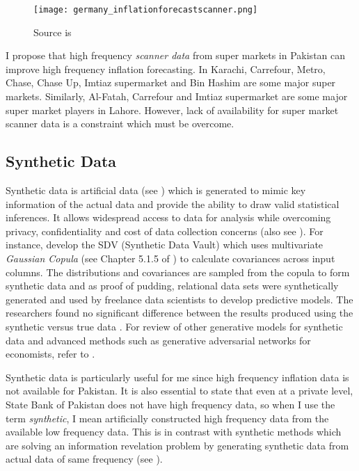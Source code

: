 \documentclass[12pt]{article}
\newcommand{\1}{\mathbbm 1}
\begin{document}
		
		
		\begin{figure}[H]
			\begin{Center}
				\texttt{[image: germany\_inflationforecastscanner.png]}
				\caption{Source is \cite{beck2022}}
			\end{Center}
		\end{figure}
		
		
		I propose that high frequency \textit{scanner data} from super markets in Pakistan can improve high frequency inflation forecasting. In Karachi, Carrefour, Metro, Chase, Chase Up, Imtiaz supermarket and Bin Hashim are some major super markets. Similarly, Al-Fatah, Carrefour and Imtiaz supermarket are some major super market players in Lahore. However, lack of availability for super market scanner data is a constraint which must be overcome. 
		
		\subsection{Synthetic Data}
		
		
		Synthetic data is artificial data (see \cite{nikolenko2021synthetic}) which is generated to mimic key information of the actual data and provide the ability to draw valid statistical inferences. It allows widespread access to data for analysis while overcoming privacy, confidentiality and cost of data collection concerns (also see \cite{raghunathan2021synthetic}). For instance, \cite{patki2016synthetic} develop the SDV (Synthetic Data Vault) which uses multivariate \textit{Gaussian Copula} (see Chapter 5.1.5 of \cite{stachurski2016primer}) to calculate covariances across input columns. The distributions and covariances are sampled from the copula to form synthetic data and as proof of pudding, relational data sets were synthetically generated and used by freelance data scientists to develop predictive models. The researchers found no significant difference between the results produced using the synthetic versus true data \cite{patki2016synthetic}. For review of other generative models for synthetic data and advanced methods such as generative adversarial networks for economists, refer to \cite{koenecke2020synthetic}.
		
		Synthetic data is particularly useful for me since high frequency inflation data is not available for Pakistan. It is also essential to state that even at a private level, State Bank of Pakistan does not have high frequency data, so when I use the term \textit{synthetic}, I mean artificially constructed high frequency data from the available low frequency data. This is in contrast with synthetic methods which are solving an information revelation problem by generating synthetic data from actual data of same frequency (see \cite{patki2016synthetic}). 
		
\end{document}
